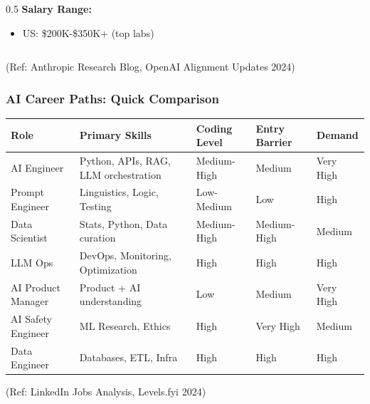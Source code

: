 \begin{frame}[fragile]
\begin{columns}
\begin{column}[T]{0.5\linewidth}
\textbf{Salary Range:}
\begin{itemize}
\item US: \$200K-\$350K+ (top labs)
\end{itemize}
    \end{column}
\end{columns}

{\tiny (Ref: Anthropic Research Blog, OpenAI Alignment Updates 2024)}
\end{frame}

\begin{frame}[fragile]\frametitle{AI Career Paths: Quick Comparison}
\begin{center}
\small
\begin{tabular}{|p{1.8cm}|p{2.5cm}|p{1.8cm}|p{1.8cm}|p{1.5cm}|}
\hline
\textbf{Role} & \textbf{Primary Skills} & \textbf{Coding Level} & \textbf{Entry Barrier} & \textbf{Demand} \\
\hline
AI Engineer & Python, APIs, RAG, LLM orchestration & Medium-High & Medium & Very High \\
\hline
Prompt Engineer & Linguistics, Logic, Testing & Low-Medium & Low & High \\
\hline
Data Scientist & Stats, Python, Data curation & Medium-High & Medium-High & Medium \\
\hline
LLM Ops & DevOps, Monitoring, Optimization & High & High & High \\
\hline
AI Product Manager & Product + AI understanding & Low & Medium & Very High \\
\hline
AI Safety Engineer & ML Research, Ethics & High & Very High & Medium \\
\hline
Data Engineer & Databases, ETL, Infra & High & High & High \\
\hline
\end{tabular}
\end{center}


{\tiny (Ref: LinkedIn Jobs Analysis, Levels.fyi 2024)}
\end{frame}

